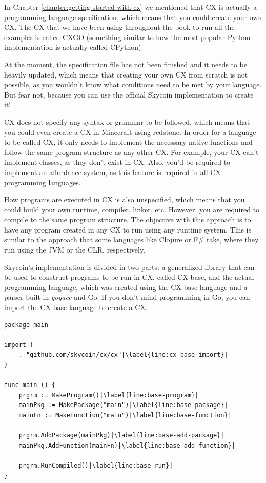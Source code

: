 \documentclass[11pt,fleqn,openany]{book} %
\begin{document}
In Chapter \ref{chapter:getting-started-with-cx} we mentioned that CX is actually a programming language specification, which means that you could create your own CX. The CX that we have been using throughout the book to run all the examples is called CXGO (something similar to how the most popular Python implementation is actually called CPython).

At the moment, the specification file has not been finished and it needs to be heavily updated, which means that creating your own CX from scratch is not possible, as you wouldn't know what conditions need to be met by your language. But fear not, because you can use the official Skycoin implementation to create it!

CX does not specify any syntax or grammar to be followed, which means that you could even create a CX in Minecraft using redstone. In order for a language to be called CX, it only needs to implement the necessary native functions and follow the same program structure as any other CX. For example, your CX can't implement classes, as they don't exist in CX. Also, you'd be required to implement an affordance system, as this feature is required in all CX programming languages.

How programs are executed in CX is also unspecified, which means that you could build your own runtime, compiler, linker, etc. However, you are required to compile to the same program structure. The objective with this approach is to have any program created in any CX to run using any runtime system. This is similar to the approach that some languages like Clojure or F\# take, where they run using the JVM or the CLR, respectively.

Skycoin's implementation is divided in two parts: a generalized library that can be used to construct programs to be run in CX, called CX base, and the actual programming language, which was created using the CX base language and a parser built in \emph{goyacc} and Go. If you don't mind programming in Go, you can import the CX base language to create a CX.

\begin{lstlisting}[caption={Writing a program using CX base language},captionpos=b,label={listing:cx-base-program}]
package main

import (
	. "github.com/skycoin/cx/cx"|\label{line:cx-base-import}|
)

func main () {
	prgrm := MakeProgram()|\label{line:base-program}|
	mainPkg := MakePackage("main")|\label{line:base-package}|
	mainFn := MakeFunction("main")|\label{line:base-function}|

	prgrm.AddPackage(mainPkg)|\label{line:base-add-package}|
	mainPkg.AddFunction(mainFn)|\label{line:base-add-function}|

	prgrm.RunCompiled()|\label{line:base-run}|
}
\end{lstlisting}
\end{document}
